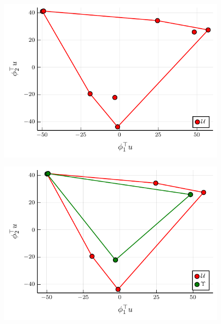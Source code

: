 \documentclass{beamer}
\begin{document}
\begin{frame}

\begin{figure}
  \centering
  \includegraphics[width=\linewidth]{plots/visual_U.pdf}
\end{figure}
\end{frame}

\begin{frame}

\begin{figure}
  \centering
  \includegraphics[width=\linewidth]{plots/visual_U_and_Upsilon.pdf}
\end{figure}
\end{frame}
\end{document}
